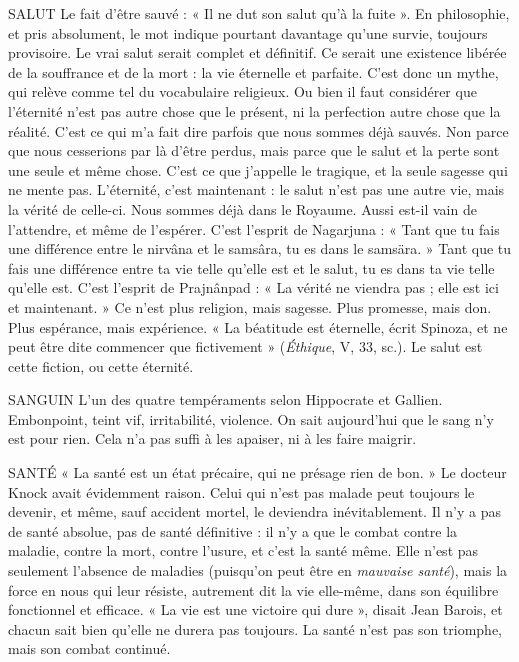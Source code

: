 SALUT Le fait d’être sauvé : « Il ne dut son salut qu’à la fuite ». En philosophie,
et pris absolument, le mot indique pourtant davantage qu’une
survie, toujours provisoire. Le vrai salut serait complet et définitif. Ce serait une
existence libérée de la souffrance et de la mort : la vie éternelle et parfaite. C’est
donc un mythe, qui relève comme tel du vocabulaire religieux. Ou bien il faut
considérer que l'éternité n’est pas autre chose que le présent, ni la perfection
autre chose que la réalité. C’est ce qui m’a fait dire parfois que nous sommes
déjà sauvés. Non parce que nous cesserions par là d’être perdus, mais parce que
le salut et la perte sont une seule et même chose. C’est ce que j’appelle le tragique,
et la seule sagesse qui ne mente pas. L’éternité, c’est maintenant : le salut
n'est pas une autre vie, mais la vérité de celle-ci. Nous sommes déjà dans le
Royaume. Aussi est-il vain de l’attendre, et même de l’espérer. C’est l'esprit de
Nagarjuna : « Tant que tu fais une différence entre le nirvâna et le samsâra, tu
es dans le samsära. » Tant que tu fais une différence entre ta vie telle qu’elle est
et le salut, tu es dans ta vie telle qu’elle est. C’est l'esprit de Prajnânpad : « La
vérité ne viendra pas ; elle est ici et maintenant. » Ce n’est plus religion, mais
sagesse. Plus promesse, mais don. Plus espérance, mais expérience. « La béatitude
est éternelle, écrit Spinoza, et ne peut être dite commencer que
fictivement » ({\it Éthique}, V, 33, sc.). Le salut est cette fiction, ou cette éternité.

SANGUIN L'un des quatre tempéraments selon Hippocrate et Gallien. Embonpoint,
teint vif, irritabilité, violence. On sait aujourd’hui que le
sang n'y est pour rien. Cela n’a pas suffi à les apaiser, ni à les faire maigrir.

SANTÉ  « La santé est un état précaire, qui ne présage rien de bon. » Le docteur
Knock avait évidemment raison. Celui qui n’est pas malade
peut toujours le devenir, et même, sauf accident mortel, le deviendra inévitablement.
Il n’y a pas de santé absolue, pas de santé définitive : il n’y a que le
combat contre la maladie, contre la mort, contre l’usure, et c’est la santé même.
Elle n’est pas seulement l’absence de maladies (puisqu’on peut être en {\it mauvaise
santé}), mais la force en nous qui leur résiste, autrement dit la vie elle-même,
dans son équilibre fonctionnel et efficace. « La vie est une victoire qui dure »,
disait Jean Barois, et chacun sait bien qu’elle ne durera pas toujours. La santé
n'est pas son triomphe, mais son combat continué.

